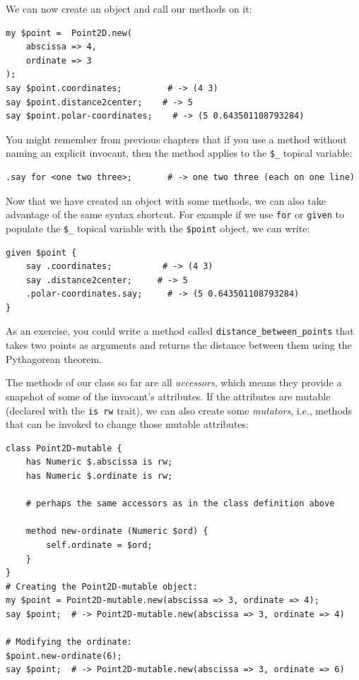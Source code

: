 We can now create an object and call our methods on it:

\begin{verbatim}
my $point =  Point2D.new(
    abscissa => 4, 
    ordinate => 3
);
say $point.coordinates;         # -> (4 3)
say $point.distance2center;    # -> 5
say $point.polar-coordinates;    # -> (5 0.643501108793284)
\end{verbatim}

You might remember from previous chapters that if you use a method 
without naming an explicit invocant, then the method applies to 
the \verb'$_' topical variable:

\begin{verbatim}
.say for <one two three>;       # -> one two three (each on one line)
\end{verbatim}

Now that we have created an object with some methods, we can also 
take advantage of the same syntax shortcut. For example if we 
use {\tt for} or {\tt given} to populate the \verb'$_' topical 
variable with the \verb'$point' object, we can write:

\begin{verbatim}
given $point {
    say .coordinates;          # -> (4 3)                       
    say .distance2center;     # -> 5                 
    .polar-coordinates.say;     # -> (5 0.643501108793284)
}    
\end{verbatim}

As an exercise, you could write a method called 
\verb"distance_between_points" that takes two points 
as arguments and returns the distance between
them using the Pythagorean theorem.

The methods of our class so far are all \emph{accessors}, which 
means they provide a snapshot of some of the invocant's attributes. 
If the attributes are mutable (declared with the \verb'is rw' 
trait), we can also create some \emph{mutators}, i.e., methods 
that can be invoked to change those mutable attributes:

\begin{verbatim}
class Point2D-mutable {
    has Numeric $.abscissa is rw;
    has Numeric $.ordinate is rw;
    
    # perhaps the same accessors as in the class definition above
    
    method new-ordinate (Numeric $ord) {
        self.ordinate = $ord; 
    }
}
# Creating the Point2D-mutable object:
my $point = Point2D-mutable.new(abscissa => 3, ordinate => 4);
say $point;  # -> Point2D-mutable.new(abscissa => 3, ordinate => 4)

# Modifying the ordinate:
$point.new-ordinate(6);
say $point;  # -> Point2D-mutable.new(abscissa => 3, ordinate => 6)
\end{verbatim}




